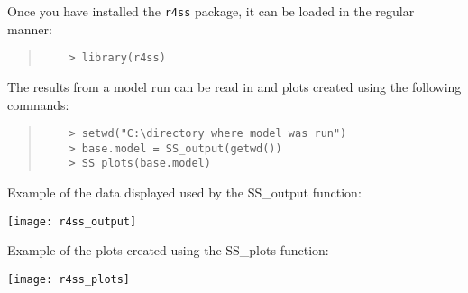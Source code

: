 Once you have installed the \texttt{r4ss} package, it can be loaded in the regular manner:

\begin{quote}
	\begin{verbatim}
	> library(r4ss)
	\end{verbatim}
\end{quote}


The results from a model run can be read in and plots created using the following commands:

\begin{quote}
	\begin{verbatim}
	> setwd("C:\directory where model was run")
	> base.model = SS_output(getwd())
	> SS_plots(base.model)
	\end{verbatim}
\end{quote}


\pagebreak
Example of the data displayed used by the SS\_output function:
\begin{center}
		\texttt{[image: r4ss\_output]}
\end{center}

\pagebreak
Example of the plots created using the SS\_plots function:
\begin{center}
	\texttt{[image: r4ss\_plots]}
\end{center}

